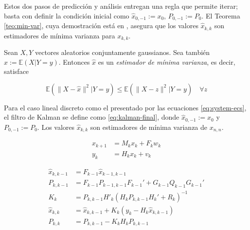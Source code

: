Estos dos pasos de predicción y análisis entregan una regla que permite iterar; basta con definir la condición inicial como \(\hat{x}_{0,-1} := x_0\), \(P_{0,-1} := P_0\). El Teorema \ref{teo:min-var}, cuya demostración está en \cite{Anderson2005}, asegura que los valores \(\hat{x}_{k,k}\) son estimadores de mínima varianza para \(x_{k,k}\).

\begin{teo}
\label{teo:min-var}
Sean \(X, Y\) vectores aleatorios conjuntamente gaussianos. Sea también \(\hat{x} := \mathbb{E}(X|Y=y)\). Entonces \(\hat{x}\) es un
\emph{estimador de mínima varianza}, es decir, satisface

\[
\mathbb{E}(\| X - \hat{x}\|^2 | Y = y) \leq \mathbb{E}(\| X - z\|^2 | Y = y) \quad \forall z
\]
\end{teo}


\begin{mdframed}[style=mystyle,frametitle=Filtro de Kalman Lineal Discreto]

Para el caso lineal discreto como el presentado por las ecuaciones \ref{eq:system-ecs}, el filtro de Kalman se define como \ref{eq:kalman-final}, donde \(\hat{x}_{0,-1}:= x_0\) y \(P_{0,-1}:= P_0\). Los valores \(\hat{x}_{k,k}\) son estimadores de mínima varianza de \(x_{n,n}\). 

\begin{equation}\label{eq:system-ecs}
\begin{aligned}
x_{k+1} &= M_k x_k + F_k w_k \\ 
y_k &= H_k x_k + v_k
\end{aligned}
\end{equation}


\begin{equation}\label{eq:kalman-final}
\begin{aligned}
\hat{x}_{k,k-1} &= F_{k-1} \hat{x}_{k-1,k-1} \\
P_{k,k-1} &= F_{k-1} P_{k-1,k-1} F_{k-1}' + G_{k-1} Q_{k-1} G_{k-1}'\\
K_k &= P_{k,k-1} H'_{k}(H_{k}P_{k,k-1}H_{k}' + R_k)^{-1}\\
\hat{x}_{k,k} &= \hat{x}_{k, k-1} + K_k(y_k-H_k \hat{x}_{k,k-1}) \\
P_{k,k} &= P_{k,k-1}- K_k H_{k}P_{k,k-1} \\
\end{aligned}
\end{equation}

\end{mdframed}


